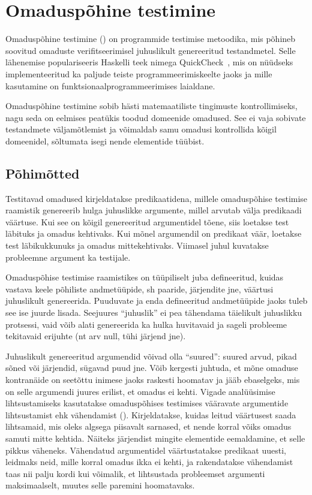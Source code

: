 \documentclass[../thesis.tex]{subfiles}
\begin{document}
\section{Omaduspõhine testimine}
Omaduspõhine testimine () on programmide testimise metoodika, mis põhineb soovitud omaduste verifitseerimisel juhuslikult genereeritud testandmetel. Selle lähenemise populariseeris Haskelli teek nimega QuickCheck~\cite{claessen_quickcheck}, mis on nüüdseks implementeeritud ka paljude teiste programmeerimiskeelte jaoks ja mille kasutamine on funktsionaalprogrammeerimises laialdane.

Omaduspõhine testimine sobib hästi matemaatiliste tingimuste kontrollimiseks, nagu seda on eelmises peatükis toodud domeenide omadused. See ei vaja sobivate testandmete väljamõtlemist ja võimaldab samu omadusi kontrollida kõigil domeenidel, sõltumata isegi nende elementide tüübist.

\subsection{Põhimõtted}
Testitavad omadused kirjeldatakse predikaatidena, millele omaduspõhise testimise raamistik genereerib hulga juhuslikke argumente, millel arvutab välja predikaadi väärtuse. Kui see on kõigil genereeritud argumentidel tõene, siis loetakse test läbituks ja omadus kehtivaks. Kui mõnel argumendil on predikaat väär, loetakse test läbikukkunuks ja omadus mittekehtivaks. Viimasel juhul kuvatakse probleemne argument ka testijale.

Omaduspõhise testimise raamistikes on tüüpiliselt juba defineeritud, kuidas vastava keele põhiliste andmetüüpide, sh paaride, järjendite jne, väärtusi juhuslikult genereerida. Puuduvate ja enda defineeritud andmetüüpide jaoks tuleb see ise juurde lisada. Seejuures \enquote{juhuslik} ei pea tähendama täielikult juhuslikku protsessi, vaid võib alati genereerida ka hulka huvitavaid ja sageli probleeme tekitavaid erijuhte (nt arv null, tühi järjend jne).

Juhuslikult genereeritud argumendid võivad olla \enquote{suured}: suured arvud, pikad sõned või järjendid, sügavad puud jne. Võib kergesti juhtuda, et mõne omaduse kontranäide on seetõttu inimese jaoks raskesti hoomatav ja jääb ebaselgeks, mis on selle argumendi juures erilist, et omadus ei kehti. Vigade analüüsimise lihtsustamiseks kasutatakse omaduspõhises testimises vääravate argumentide lihtsustamist ehk vähendamist (). Kirjeldatakse, kuidas leitud väärtusest saada lihtsamaid, mis oleks algsega piisavalt sarnased, et nende korral võiks omadus samuti mitte kehtida. Näiteks järjendist mingite elementide eemaldamine, et selle pikkus väheneks. Vähendatud argumentidel väärtustatakse predikaat uuesti, leidmaks neid, mille korral omadus ikka ei kehti, ja rakendatakse vähendamist taas nii palju kordi kui võimalik, et lihtsustada probleemset argumenti maksimaalselt, muutes selle paremini hoomatavaks.
\end{document}
